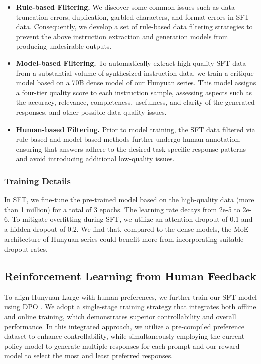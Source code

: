 \documentclass{article}
\begin{document}
\begin{itemize}[leftmargin=10pt]
    \item \textbf{Rule-based Filtering.}
    We discover some common issues such as data truncation errors, duplication, garbled characters, and format errors in SFT data. Consequently, we develop a set of rule-based data filtering strategies to prevent the above instruction extraction and generation models from producing undesirable outputs.
    \item \textbf{Model-based Filtering.}
    To automatically extract high-quality SFT data from a substantial volume of synthesized instruction data, we train a critique model \citep{mcaleese2024llm} based on a 70B dense model of our Hunyuan series. This model assigns a four-tier quality score to each instruction sample, assessing aspects such as the accuracy, relevance, completeness, usefulness, and clarity of the generated responses, and other possible data quality issues. %
    \item \textbf{Human-based Filtering.}
    Prior to model training, the SFT data filtered via rule-based and model-based methods further undergo human annotation, ensuring that answers adhere to the desired task-specific response patterns and avoid introducing additional low-quality issues.
\end{itemize}

\subsubsection{Training Details}
In SFT, we fine-tune the pre-trained model based on the high-quality data (more than 1 million) for a total of 3 epochs. The learning rate decays from 2e-5 to 2e-6. To mitigate overfitting during SFT, we utilize an attention dropout of 0.1 and a hidden dropout of 0.2. We find that, compared to the dense models, the MoE architecture of Hunyuan series could benefit more from incorporating suitable dropout rates.

\subsection{Reinforcement Learning from Human Feedback}

To align Hunyuan-Large with human preferences, we further train our SFT model using DPO \citep{rafailov2024direct}. We adopt a single-stage training strategy that integrates both offline and online training, which demonstrates superior controllability and overall performance. In this integrated approach, we utilize a pre-compiled preference dataset to enhance controllability, while simultaneously employing the current policy model to generate multiple responses for each prompt and our reward model to select the most and least preferred responses.
\end{document}
